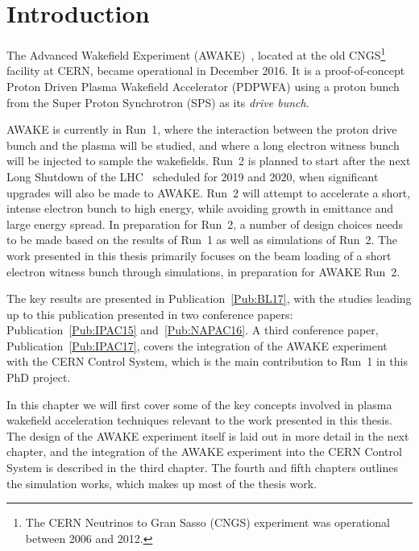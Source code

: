 %
%

\chapter{Introduction}
\label{Ch:Intro}

The Advanced Wakefield Experiment (AWAKE)~\cite{awake_collaboration:2014}, located at the old CNGS\footnote{The CERN Neutrinos to Gran Sasso (CNGS) experiment was operational between 2006 and 2012.} facility at CERN, became operational in December 2016.
It is a proof-of-concept Proton Driven Plasma Wakefield Accelerator (PDPWFA) using a proton bunch from the Super Proton Synchrotron (SPS) as its \textit{drive bunch}.

AWAKE is currently in Run~1, where the interaction between the proton drive bunch and the plasma will be studied, and where a long electron witness bunch will be injected to sample the wakefields.
Run~2 is planned to start after the next Long Shutdown of the LHC~\cite{bernardini:2016} scheduled for 2019 and 2020, when significant upgrades will also be made to AWAKE.
Run~2 will attempt to accelerate a short, intense electron bunch to high energy, while avoiding growth in emittance and large energy spread.
In preparation for Run~2, a number of design choices needs to be made based on the results of Run~1 as well as simulations of Run~2.
The work presented in this thesis primarily focuses on the beam loading of a short electron witness bunch through simulations, in preparation for AWAKE Run~2.

The key results are presented in Publication~\ref{Pub:BL17}, with the studies leading up to this publication presented in two conference papers: Publication~\ref{Pub:IPAC15} and~\ref{Pub:NAPAC16}.
A third conference paper, Publication~\ref{Pub:IPAC17}, covers the integration of the AWAKE experiment with the CERN Control System, which is the main contribution to Run~1 in this PhD project.

In this chapter we will first cover some of the key concepts involved in plasma wakefield acceleration techniques relevant to the work presented in this thesis.
The design of the AWAKE experiment itself is laid out in more detail in the next chapter, and the integration of the AWAKE experiment into the CERN Control System is described in the third chapter.
The fourth and fifth chapters outlines the simulation works, which makes up most of the thesis work.

